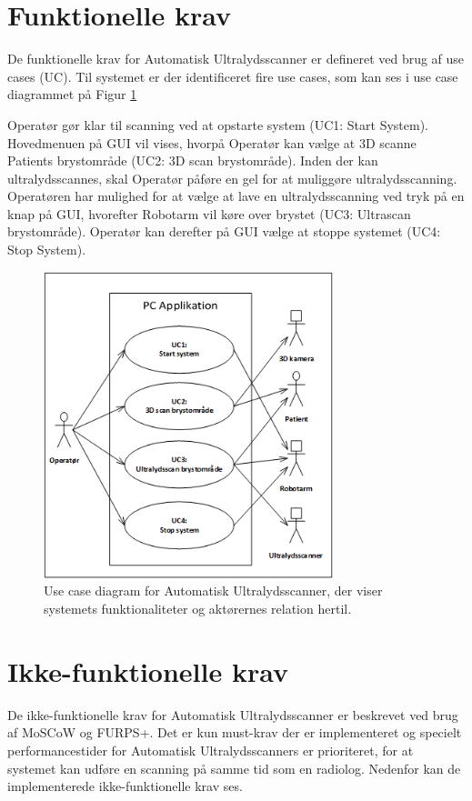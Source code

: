 \section{Funktionelle krav}
De funktionelle krav for Automatisk Ultralydsscanner er defineret ved brug af use cases (UC). Til systemet er der identificeret fire use cases, som kan ses i use case diagrammet på Figur \ref{UseCaseDiagram} 

Operatør gør klar til scanning ved at opstarte system (UC1: Start System). Hovedmenuen på GUI vil vises, hvorpå Operatør kan vælge at 3D scanne Patients brystområde (UC2: 3D scan brystområde). Inden der kan ultralydsscannes, skal Operatør påføre en gel for at muliggøre ultralydsscanning. Operatøren har mulighed for at vælge at lave en ultralydsscanning ved tryk på en knap på GUI, hvorefter Robotarm vil køre over brystet (UC3: Ultrascan brystområde).  Operatør kan derefter på GUI vælge at stoppe systemet (UC4: Stop System). 

\begin{figure}[H]
    \centering
    \includegraphics[width=0.75\textwidth]{figurer/d/Kravspecifikation/UseCaseDiagram}
    \caption{Use case diagram for Automatisk Ultralydsscanner, der viser systemets funktionaliteter og aktørernes relation hertil.}
    \label{UseCaseDiagram}
\end{figure}

\section{Ikke-funktionelle krav}
De ikke-funktionelle krav for Automatisk Ultralydsscanner er beskrevet ved brug af MoSCoW og FURPS+. Det er kun must-krav der er implementeret og specielt performancestider for Automatisk Ultralydsscanners er prioriteret, for at systemet kan udføre en scanning på samme tid som en radiolog. Nedenfor kan de implementerede ikke-funktionelle krav ses. 

